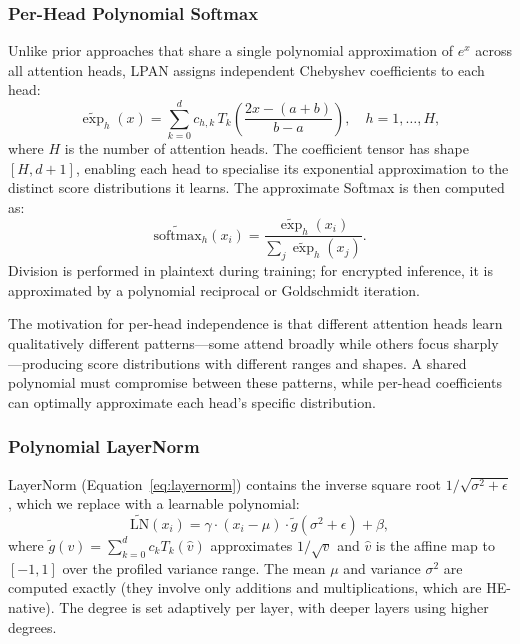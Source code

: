 \subsubsection{Per-Head Polynomial Softmax}
\label{sec:perhead_softmax}

Unlike prior approaches that share a single polynomial approximation of $e^x$ across all attention heads, LPAN assigns independent Chebyshev coefficients to each head:
\begin{equation}
    \widetilde{\exp}_h(x) = \sum_{k=0}^{d} c_{h,k}\, T_k\!\left(\frac{2x - (a+b)}{b-a}\right), \quad h = 1, \ldots, H,
    \label{eq:perhead_exp}
\end{equation}
where $H$ is the number of attention heads. The coefficient tensor has shape $[H, d+1]$, enabling each head to specialise its exponential approximation to the distinct score distributions it learns. The approximate Softmax is then computed as:
\begin{equation}
    \widetilde{\mathrm{softmax}}_h(x_i) = \frac{\widetilde{\exp}_h(x_i)}{\sum_{j} \widetilde{\exp}_h(x_j)}.
    \label{eq:perhead_softmax}
\end{equation}
Division is performed in plaintext during training; for encrypted inference, it is approximated by a polynomial reciprocal or Goldschmidt iteration.

The motivation for per-head independence is that different attention heads learn qualitatively different patterns---some attend broadly while others focus sharply---producing score distributions with different ranges and shapes. A shared polynomial must compromise between these patterns, while per-head coefficients can optimally approximate each head's specific distribution.

\subsubsection{Polynomial LayerNorm}
\label{sec:poly_layernorm}

LayerNorm (Equation~\ref{eq:layernorm}) contains the inverse square root $1/\sqrt{\sigma^2 + \epsilon}$, which we replace with a learnable polynomial:
\begin{equation}
    \widetilde{\mathrm{LN}}(x_i) = \gamma \cdot (x_i - \mu) \cdot \widetilde{g}(\sigma^2 + \epsilon) + \beta,
    \label{eq:poly_ln}
\end{equation}
where $\widetilde{g}(v) = \sum_{k=0}^{d} c_k T_k(\hat{v})$ approximates $1/\sqrt{v}$ and $\hat{v}$ is the affine map to $[-1, 1]$ over the profiled variance range. The mean $\mu$ and variance $\sigma^2$ are computed exactly (they involve only additions and multiplications, which are HE-native). The degree is set adaptively per layer, with deeper layers using higher degrees.

